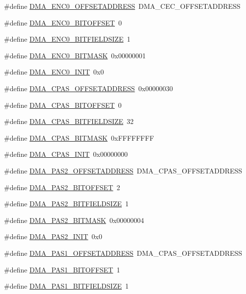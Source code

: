 \begin{DoxyCompactItemize}
\item 
\#define \hyperlink{a00547_afd17ceb26b10783c0e9a75fb71b59c58}{DMA\_\-ENC0\_\-OFFSETADDRESS}~DMA\_\-CEC\_\-OFFSETADDRESS
\item 
\#define \hyperlink{a00547_a51805221f0eead88a3117ce96401034e}{DMA\_\-ENC0\_\-BITOFFSET}~0
\item 
\#define \hyperlink{a00547_a43b7b8c4115ad0c48348575c006b0c93}{DMA\_\-ENC0\_\-BITFIELDSIZE}~1
\item 
\#define \hyperlink{a00547_ab043380a7b62306b88650d2576278839}{DMA\_\-ENC0\_\-BITMASK}~0x00000001
\item 
\#define \hyperlink{a00547_a471b7e728bf00f081a271e4d9d059703}{DMA\_\-ENC0\_\-INIT}~0x0
\item 
\#define \hyperlink{a00547_a2d0e0c971d49c174c17485ec07bfd858}{DMA\_\-CPAS\_\-OFFSETADDRESS}~0x00000030
\item 
\#define \hyperlink{a00547_af28721122278e380bce65f3eccafca96}{DMA\_\-CPAS\_\-BITOFFSET}~0
\item 
\#define \hyperlink{a00547_a6a4be6421656f9441bcfc4f13c592ccb}{DMA\_\-CPAS\_\-BITFIELDSIZE}~32
\item 
\#define \hyperlink{a00547_aa581767bbc03109ac7c77e8dc94bdbeb}{DMA\_\-CPAS\_\-BITMASK}~0xFFFFFFFF
\item 
\#define \hyperlink{a00547_a28d602f9acd61477951276ecf61ae35a}{DMA\_\-CPAS\_\-INIT}~0x00000000
\item 
\#define \hyperlink{a00547_a36b6b7e7f9dd401f092a6910d5244091}{DMA\_\-PAS2\_\-OFFSETADDRESS}~DMA\_\-CPAS\_\-OFFSETADDRESS
\item 
\#define \hyperlink{a00547_a94c7da41f0237a1fbbe4476d8f99c991}{DMA\_\-PAS2\_\-BITOFFSET}~2
\item 
\#define \hyperlink{a00547_af5e2335b39cfc91dbc4ee39ba6531804}{DMA\_\-PAS2\_\-BITFIELDSIZE}~1
\item 
\#define \hyperlink{a00547_af8c4e3089e94a831564acfd1a85a95bb}{DMA\_\-PAS2\_\-BITMASK}~0x00000004
\item 
\#define \hyperlink{a00547_a2139cf00ca58fa907b6a254c2b662cb6}{DMA\_\-PAS2\_\-INIT}~0x0
\item 
\#define \hyperlink{a00547_adfeca7ea4b143ed349bd23de9a0bb9fd}{DMA\_\-PAS1\_\-OFFSETADDRESS}~DMA\_\-CPAS\_\-OFFSETADDRESS
\item 
\#define \hyperlink{a00547_aa6ae0da6647d82b9b1d74b9761ad0d62}{DMA\_\-PAS1\_\-BITOFFSET}~1
\item 
\#define \hyperlink{a00547_a97550444879097fc90d1688f874d3c04}{DMA\_\-PAS1\_\-BITFIELDSIZE}~1

\end{DoxyCompactItemize}
